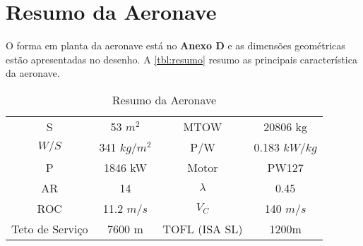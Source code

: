 \chapter{Resumo da Aeronave}
\label{tabelaresumo}

O forma em planta da aeronave está no \textbf{Anexo D} e as dimensões geométricas estão apresentadas no desenho. A \autoref{tbl:resumo} resumo as principais característica da aeronave.

\begin{table}[H]
\centering
\begin{tabular}{cccc}
\toprule
S & 53 $m^2$ & MTOW  & 20806 kg\\
$W/S$ & 341 $kg/m^2$ & P/W  & 0.183 $kW/kg$ \\
P & 1846 kW & Motor & PW127 \\
AR & 14 & $\lambda$ & 0.45 \\
ROC & 11.2 $m/s$ & $V_C$ & 140 $m/s$ \\
Teto de Serviço & 7600 m & TOFL (ISA SL) & 1200m \\
\bottomrule
\end{tabular}
\caption{Resumo da Aeronave}
\label{tbl:resumo}
\end{table}
